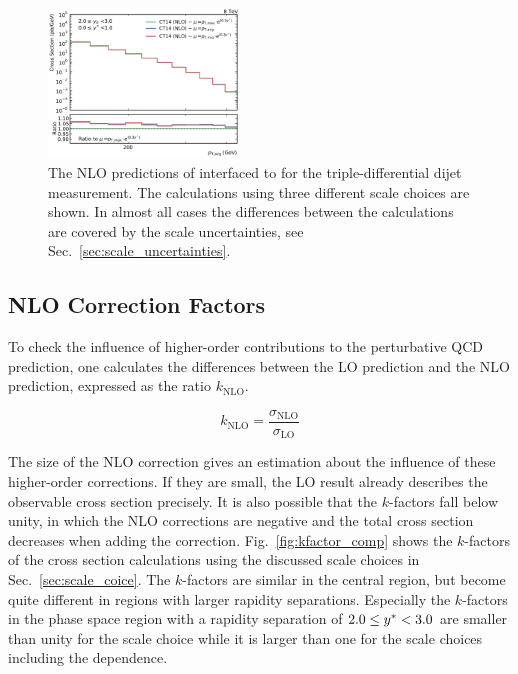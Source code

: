 \begin{figure}[htp]
    \includegraphics[width=0.45\textwidth]{figures/theory/nlo_xs_comp_yb2ys0.pdf}
    \caption{The NLO predictions of \fastNLO interfaced to \NLOJETPP for the
        triple-differential dijet measurement. The
    calculations using three different scale choices are shown. In almost all cases
    the differences between the calculations are covered by the scale
    uncertainties, see Sec.~\ref{sec:scale_uncertainties}.}
    \label{fig:xs_nlo_comp}
\end{figure}


\subsection{NLO Correction Factors}
\label{sec:k_factors}

To check the influence of higher-order contributions to the perturbative QCD
prediction, one calculates the differences between the LO prediction and the NLO
prediction, expressed as the ratio $k_\mathrm{NLO}$.

\begin{equation*}
    k_{\mathrm{NLO}} = \frac{\sigma_{\mathrm{NLO}}}{\sigma_{\mathrm{LO}}}
\end{equation*}

The size of the NLO correction gives an estimation about the influence of these
higher-order corrections. If they are small, the LO result already describes the
observable cross section precisely. It is also possible that the $k$-factors
fall below unity, in which the NLO corrections are negative and the total cross
section decreases when adding the correction.  Fig.~\ref{fig:kfactor_comp} shows
the $k$-factors of the \NLOJETPP cross section calculations using the discussed
scale choices in Sec.~\ref{sec:scale_coice}. The $k$-factors are similar in the
central region, but become quite different in regions with larger rapidity
separations.  Especially the $k$-factors in the phase space region with a
rapidity separation of $2.0 \leq y^* < 3.0$ are smaller than unity for the
\ptavg scale choice while it is larger than one for the scale choices including
the \ystar dependence.


